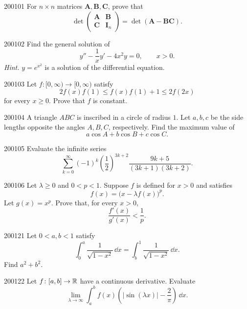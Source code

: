 
\begin{problem}{2001}{0}{1}
For $n\times n$ matrices $\mathbf A, \mathbf B, \mathbf C$, prove that
\[
    \det
    \begin{pmatrix}
        \mathbf A & \mathbf B\\
        \mathbf C & \mathbf I_n
    \end{pmatrix}
    =
    \det(\mathbf A-\mathbf B\mathbf C).
\]
\end{problem}

\begin{problem}{2001}{0}{2}
Find the general solution of
\[
    y''-\frac1x y'-4x^2y=0,
    \qquad x>0.
\]
\textit{Hint.} $y=e^{x^2}$ is a solution of the differential equation.
\end{problem}

\begin{problem}{2001}{0}{3}
Let $f\colon[0, \infty)\to[0, \infty)$ satisfy
\[
    2f(x)f(1)
    \le
    f(x)f(1)+1
    \le
    2f(2x)
\]
for every $x\ge0$. Prove that $f$ is constant.
\end{problem}

\begin{problem}{2001}{0}{4}
A triangle $ABC$ is inscribed in a circle of radius $1$. Let $a, b, c$ be the side lengths opposite the angles $A, B, C$, respectively. Find the maximum value of
\[
    a\cos A+b\cos B+c\cos C.
\]
\end{problem}

\begin{problem}{2001}{0}{5}
Evaluate the infinite series
\[
    \sum_{k=0}^{\infty}
    (-1)^k
    \left(\frac12\right)^{3k+2}
    \frac{9k+5}{(3k+1)(3k+2)}.
\]
\end{problem}

\begin{problem}{2001}{0}{6}
Let $\lambda\ge0$ and $0<p<1$. Suppose $f$ is defined for $x>0$ and satisfies
\[
    f(x)=\bigl(x-\lambda f(x)\bigr)^p.
\]
Let $g(x)=x^p$. Prove that, for every $x>0$,
\[
    \frac{f'(x)}{g'(x)}<\frac1p.
\]
\end{problem}

\begin{problem}{2001}{2}{1}
Let $0<a, b<1$ satisfy
\[
    \int_0^a\frac{1}{\sqrt{1-x^2}}\, \dd x
    =
    \int_b^1\frac{1}{\sqrt{1-x^2}}\, \dd x.
\]
Find $a^2+b^2$.
\end{problem}

\begin{problem}{2001}{2}{2}
Let $f\colon[a, b]\to\mathbb{R}$ have a continuous derivative. Evaluate
\[
    \lim_{\lambda\to\infty}
    \int_a^b
    f(x)\left(|\sin(\lambda x)|-\frac2\pi\right)\, \dd x.
\]
\end{problem}

